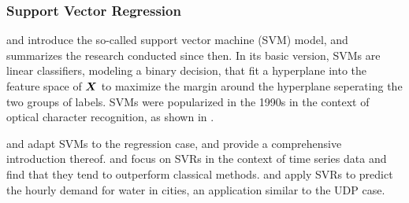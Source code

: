\subsubsection{Support Vector Regression}
\label{svm}

\cite{vapnik1963} and \cite{vapnik1964} introduce the so-called support vector
    machine (SVM) model, and \cite{vapnik2013} summarizes the research
    conducted since then.
In its basic version, SVMs are linear classifiers, modeling a binary
    decision, that fit a hyperplane into the feature space of $\bm{X}$ to
    maximize the margin around the hyperplane seperating the two groups of
    labels.
SVMs were popularized in the 1990s in the context of optical character
    recognition, as shown in \cite{scholkopf1998}.

\cite{drucker1997} and \cite{stitson1999} adapt SVMs to the regression case,
    and \cite{smola2004} provide a comprehensive introduction thereof.
\cite{mueller1997} and \cite{mueller1999} focus on SVRs in the context of time
    series data and find that they tend to outperform classical methods.
\cite{chen2006a} and \cite{chen2006b} apply SVRs to predict the hourly demand
    for water in cities, an application similar to the UDP case.

